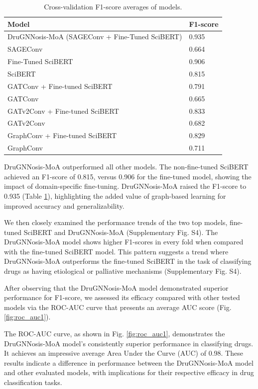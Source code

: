 \documentclass[journal,twoside,web]{ieeecolor}
\begin{document}
\begin{table}
\caption{Cross-validation F1-score averages of models.}
\label{tbl:cv_scores}%
\begin{tabular*}{\columnwidth}{@{\extracolsep\fill}ll@{\extracolsep\fill}}
\toprule
Model & F1-score \\
\midrule
DruGNNosis-MoA (SAGEConv + Fine-Tuned SciBERT) & 0.935 \\
SAGEConv & 0.664 \\
Fine-Tuned SciBERT & 0.906 \\
SciBERT & 0.815 \\
GATConv + Fine-tuned SciBERT & 0.791 \\
GATConv & 0.665 \\
GATv2Conv + Fine-tuned SciBERT & 0.833 \\
GATv2Conv & 0.682 \\
GraphConv + Fine-tuned SciBERT & 0.829 \\
GraphConv & 0.711 \\
\bottomrule
\end{tabular*}
\end{table}



DruGNNosis-MoA outperformed all other models.
The non-fine-tuned SciBERT achieved an F1-score of 0.815, versus 0.906 for the fine-tuned model, showing the impact of domain-specific fine-tuning. 
DruGNNosis-MoA raised the F1-score to 0.935 (Table \ref{tbl:cv_scores}), highlighting the added value of graph-based learning for improved accuracy and generalizability.

We then closely examined the performance trends of the two top models, fine-tuned SciBERT and DruGNNosis-MoA (Supplementary Fig. S4). %
The DruGNNosis-MoA model shows higher F1-scores in every fold when compared with the fine-tuned SciBERT model.
This pattern suggests a trend where DruGNNosis-MoA outperforms the fine-tuned SciBERT in the task of classifying drugs as having etiological or palliative mechanisms (Supplementary Fig. S4). %

After observing that the DruGNNosis-MoA model demonstrated superior performance for F1-score, we assessed its efficacy compared with other tested models via the ROC-AUC curve that presents an average AUC score (Fig. \ref{fig:roc_auc1}).



The ROC-AUC curve, as shown in Fig. \ref{fig:roc_auc1}, 
demonstrates the DruGNNosis-MoA model's consistently superior performance in classifying drugs.
It achieves an impressive average Area Under the Curve (AUC) of 0.98.
These results indicate a difference in performance between the DruGNNosis-MoA model and other evaluated models, with implications for their respective efficacy in drug classification tasks.
\end{document}
